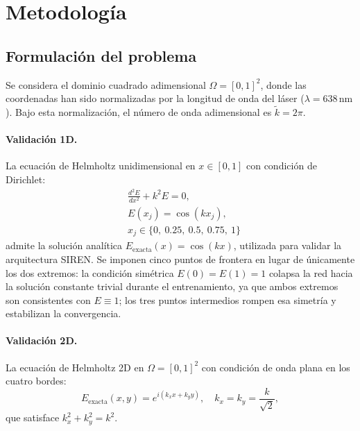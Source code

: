 
\section{Metodología}
\label{sec:metodologia}

\subsection{Formulación del problema}
\label{subsec:formulacion}

Se considera el dominio cuadrado adimensional $\Omega = [0,1]^2$, donde las coordenadas
han sido normalizadas por la longitud de onda del láser ($\lambda = 638\,\mathrm{nm}$).
Bajo esta normalización, el número de onda adimensional es $\tilde{k} = 2\pi$.

\paragraph{Validación 1D.}
La ecuación de Helmholtz unidimensional en $x \in [0,1]$ con condición de Dirichlet:
%
\begin{equation}
\label{eq:helmholtz1d}
\begin{aligned}
  &\frac{d^2 E}{dx^2} + k^2 E = 0, \\
  &E(x_j) = \cos(k x_j), \\
  &x_j \in \{0,\ 0.25,\ 0.5,\ 0.75,\ 1\}
\end{aligned}
\end{equation}
%
admite la solución analítica $E_{\mathrm{exacta}}(x) = \cos(kx)$, utilizada para
validar la arquitectura SIREN. Se imponen cinco puntos de frontera en lugar de
únicamente los dos extremos: la condición simétrica $E(0) = E(1) = 1$ colapsa
la red hacia la solución constante trivial durante el entrenamiento, ya que
ambos extremos son consistentes con $E \equiv 1$; los tres puntos intermedios
rompen esa simetría y estabilizan la convergencia.

\paragraph{Validación 2D.}
La ecuación de Helmholtz 2D en $\Omega = [0,1]^2$ con condición de onda plana en los
cuatro bordes:
%
\begin{equation}
  E_{\mathrm{exacta}}(x,y) = e^{i(k_x x + k_y y)}, \quad k_x = k_y = \frac{k}{\sqrt{2}},
  \label{eq:solucion2d}
\end{equation}
%
que satisface $k_x^2 + k_y^2 = k^2$.

